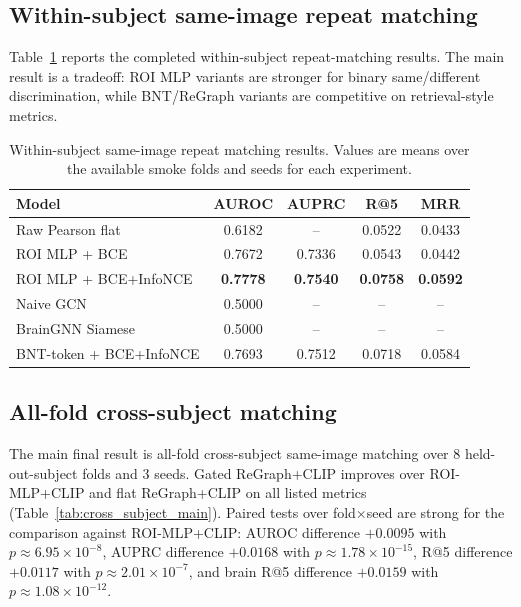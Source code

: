 \documentclass{article}
\begin{document}
\subsection{Within-subject same-image repeat matching}

Table~\ref{tab:within_subject} reports the completed within-subject repeat-matching results. The main result is a tradeoff: ROI MLP variants are stronger for binary same/different discrimination, while BNT/ReGraph variants are competitive on retrieval-style metrics.

\begin{table}[!htbp]
  \centering
  \caption{Within-subject same-image repeat matching results. Values are means over the available smoke folds and seeds for each experiment.}
  \label{tab:within_subject}
  \small
  \begin{tabular}{lcccc}
    \toprule
    Model & AUROC & AUPRC & R@5 & MRR \\
    \midrule
    Raw Pearson flat & 0.6182 & -- & 0.0522 & 0.0433 \\
    ROI MLP + BCE & 0.7672 & 0.7336 & 0.0543 & 0.0442 \\
    ROI MLP + BCE+InfoNCE & \textbf{0.7778} & \textbf{0.7540} & \textbf{0.0758} & \textbf{0.0592} \\
    Naive GCN & 0.5000 & -- & -- & -- \\
    BrainGNN Siamese & 0.5000 & -- & -- & -- \\
    BNT-token + BCE+InfoNCE & 0.7693 & 0.7512 & 0.0718 & 0.0584 \\
    \bottomrule
  \end{tabular}
\end{table}

\subsection{All-fold cross-subject matching}

The main final result is all-fold cross-subject same-image matching over 8 held-out-subject folds and 3 seeds. Gated ReGraph+CLIP improves over ROI-MLP+CLIP and flat ReGraph+CLIP on all listed metrics (Table~\ref{tab:cross_subject_main}). Paired tests over fold$\times$seed are strong for the comparison against ROI-MLP+CLIP: AUROC difference $+0.0095$ with $p\approx 6.95\times10^{-8}$, AUPRC difference $+0.0168$ with $p\approx 1.78\times10^{-15}$, R@5 difference $+0.0117$ with $p\approx 2.01\times10^{-7}$, and brain R@5 difference $+0.0159$ with $p\approx 1.08\times10^{-12}$.
\end{document}
